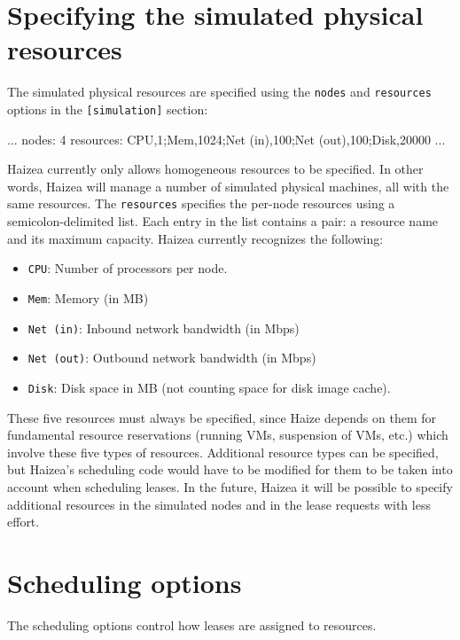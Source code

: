 \section{Specifying the simulated physical resources}

The simulated physical resources are specified using the \texttt{nodes} and \texttt{resources} options in the \texttt{[simulation]} section:

\begin{wideshellverbatim}
[simulation]
...
nodes: 4
resources: CPU,1;Mem,1024;Net (in),100;Net (out),100;Disk,20000
...
\end{wideshellverbatim}

Haizea currently only allows homogeneous resources to be specified. In other words, Haizea will manage a number of simulated physical machines, all with the same resources. The \texttt{resources} specifies the per-node resources using a semicolon-delimited list. Each entry in the list contains a pair: a resource name and its maximum capacity. Haizea currently recognizes the following:

\begin{itemize}
\item \texttt{CPU}: Number of processors per node.
\item \texttt{Mem}: Memory (in MB)
\item \texttt{Net (in)}: Inbound network bandwidth (in Mbps) 
\item \texttt{Net (out)}: Outbound network bandwidth (in Mbps) 
\item \texttt{Disk}: Disk space in MB (not counting space for disk image cache).
\end{itemize}

These five resources must always be specified, since Haize depends on them for fundamental resource reservations (running VMs, suspension of VMs, etc.) which involve these five types of resources. Additional resource types can be specified, but Haizea's scheduling code would have to be modified for them to be taken into account when scheduling leases. In the future, Haizea it will be possible to specify additional resources in the simulated nodes and in the lease requests with less effort.

\section{Scheduling options}

The scheduling options control how leases are assigned to resources.

